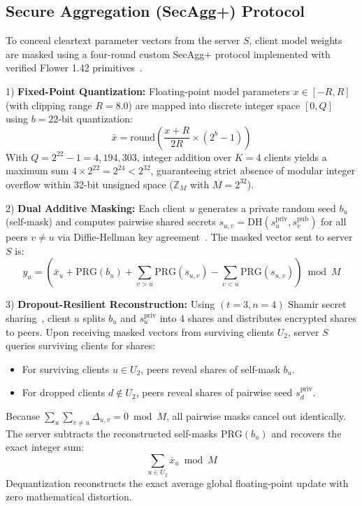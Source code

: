 \documentclass[journal,twocolumn,10pt]{IEEEtran}
\begin{document}
\subsection{Secure Aggregation (SecAgg+) Protocol}
To conceal cleartext parameter vectors from the server $S$, client model weights are masked using a four-round custom SecAgg+ protocol implemented with verified Flower 1.42 primitives~\cite{beaufays2020flower, bell2020secaggplus}.

1) \textbf{Fixed-Point Quantization:} Floating-point model parameters $x \in [-R, R]$ (with clipping range $R = 8.0$) are mapped into discrete integer space $[0, Q]$ using $b = 22$-bit quantization:
\begin{equation}
\bar{x} = \text{round}\left( \frac{x + R}{2R} \times (2^b - 1) \right)
\end{equation}
With $Q = 2^{22} - 1 = 4,194,303$, integer addition over $K=4$ clients yields a maximum sum $4 \times 2^{22} = 2^{24} < 2^{32}$, guaranteeing strict absence of modular integer overflow within 32-bit unsigned space ($\mathbb{Z}_M$ with $M = 2^{32}$).

2) \textbf{Dual Additive Masking:} Each client $u$ generates a private random seed $b_u$ (self-mask) and computes pairwise shared secrets $s_{u,v} = \text{DH}(s_u^{\text{priv}}, s_v^{\text{pub}})$ for all peers $v \ne u$ via Diffie-Hellman key agreement~\cite{diffie1976new}. The masked vector sent to server $S$ is:
\begin{equation}
y_u = \left( \bar{x}_u + \text{PRG}(b_u) + \sum_{v > u} \text{PRG}(s_{u,v}) - \sum_{v < u} \text{PRG}(s_{u,v}) \right) \bmod M
\end{equation}

3) \textbf{Dropout-Resilient Reconstruction:} Using $(t=3, n=4)$ Shamir secret sharing~\cite{shamir1979share}, client $u$ splits $b_u$ and $s_u^{\text{priv}}$ into 4 shares and distributes encrypted shares to peers. Upon receiving masked vectors from surviving clients $U_2$, server $S$ queries surviving clients for shares:
\begin{itemize}
    \item For surviving clients $u \in U_2$, peers reveal shares of self-mask $b_u$.
    \item For dropped clients $d \notin U_2$, peers reveal shares of pairwise seed $s_d^{\text{priv}}$.
\end{itemize}
Because $\sum_{u} \sum_{v \ne u} \Delta_{u,v} = 0 \bmod M$, all pairwise masks cancel out identically. The server subtracts the reconstructed self-masks $\text{PRG}(b_u)$ and recovers the exact integer sum:
\begin{equation}
\sum_{u \in U_2} \bar{x}_u \bmod M
\end{equation}
Dequantization reconstructs the exact average global floating-point update with zero mathematical distortion.
\end{document}

